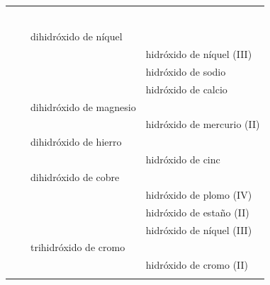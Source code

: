 \begin{landscape}
\begin{longtable}{@{}c C{2cm} C{12cm} C{12cm}@{}}
            \myorder{} &  & \rojo{} & \rojo{} \\[3pt]
            \myorder{} &  & \rojo{} & \rojo{} \\[3pt]
            \myorder{} &  & \rojo{} & \rojo{} \\[3pt]
            \myorder{} &  & \rojo{} & \rojo{} \\[3pt]
            \myorder{} &  & \rojo{} & \rojo{} \\[3pt]
            \myorder{} &  & \rojo{} & \rojo{} \\[3pt]
            \myorder{} & \rojo{\ch{}} & dihidróxido de níquel & \rojo{} \\[3pt]
            \myorder{} & \rojo{\ch{}} & \rojo{} & hidróxido de níquel  (III) \\[3pt]
            \myorder{} & \rojo{\ch{}} & \rojo{} & hidróxido de sodio \\[3pt]
            \myorder{} & \rojo{\ch{}} & \rojo{} & hidróxido de calcio \\[3pt]
            \myorder{} & \rojo{\ch{}} & dihidróxido de magnesio & \rojo{} \\[3pt]
            \myorder{} & \rojo{\ch{}} & \rojo{} & hidróxido de mercurio (II) \\[3pt]
            \myorder{} & \rojo{\ch{}} & dihidróxido de hierro & \rojo{} \\[3pt]
            \myorder{} & \rojo{\ch{}} & \rojo{} & hidróxido de cinc \\[3pt]
            \myorder{} & \rojo{\ch{}} & dihidróxido de cobre & \rojo{} \\[3pt]
            \myorder{} & \rojo{\ch{}} & \rojo{} & hidróxido de plomo (IV) \\[3pt]
            \myorder{} & \rojo{\ch{}} & \rojo{} & hidróxido de estaño (II) \\[3pt]
            \myorder{} & \rojo{\ch{}} & \rojo{} & hidróxido de níquel (III) \\[3pt]
            \myorder{} & \rojo{\ch{}} & trihidróxido de cromo & \rojo{} \\[3pt]
            \myorder{} & \rojo{\ch{}} & \rojo{} & hidróxido de cromo (II) \\[3pt]
             \\[3pt]

\end{longtable}
\end{landscape}
